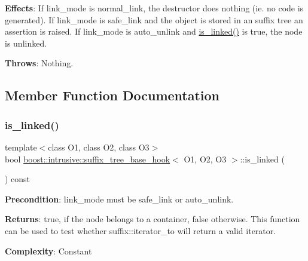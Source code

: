 {\bfseries Effects}\+: If link\+\_\+mode is {\ttfamily normal\+\_\+link}, the destructor does nothing (ie. no code is generated). If link\+\_\+mode is {\ttfamily safe\+\_\+link} and the object is stored in an suffix tree an assertion is raised. If link\+\_\+mode is {\ttfamily auto\+\_\+unlink} and {\ttfamily \hyperlink{classboost_1_1intrusive_1_1suffix__tree__base__hook_aa7681d0387834b9a0e1822e79ac1c531}{is\+\_\+linked()}} is true, the node is unlinked.

{\bfseries Throws}\+: Nothing. 

\subsection{Member Function Documentation}
\mbox{\label{classboost_1_1intrusive_1_1suffix__tree__base__hook_aa7681d0387834b9a0e1822e79ac1c531}} 
\subsubsection{\texorpdfstring{is\+\_\+linked()}{is\_linked()}}
{\footnotesize\ttfamily template$<$class O1, class O2, class O3$>$ \\
bool \hyperlink{classboost_1_1intrusive_1_1suffix__tree__base__hook}{boost\+::intrusive\+::suffix\+\_\+tree\+\_\+base\+\_\+hook}$<$ O1, O2, O3 $>$\+::is\+\_\+linked (\begin{DoxyParamCaption}{ }\end{DoxyParamCaption}) const}

{\bfseries Precondition}\+: link\+\_\+mode must be {\ttfamily safe\+\_\+link} or {\ttfamily auto\+\_\+unlink}.

{\bfseries Returns}\+: true, if the node belongs to a container, false otherwise. This function can be used to test whether {\ttfamily suffix\+::iterator\+\_\+to} will return a valid iterator.

{\bfseries Complexity}\+: Constant \mbox{\label{classboost_1_1intrusive_1_1suffix__tree__base__hook_a3f1dff2ec03d48d4c4caad6622374e7a}} 
